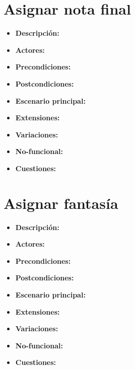 \documentclass[12pt,letterpaper]{article}
\begin{document}
\section{Asignar nota final}
\begin{itemize}
	\item \textbf{Descripción:}
	\item \textbf{Actores:}
	\item \textbf{Precondiciones:}
	\item \textbf{Postcondiciones:}
	\item \textbf{Escenario principal:}
	\item \textbf{Extensiones:}
	\item \textbf{Variaciones:}
	\item \textbf{No-funcional:}
	\item \textbf{Cuestiones:}
\end{itemize}

\section{Asignar fantasía}
\begin{itemize}
	\item \textbf{Descripción:}
	\item \textbf{Actores:}
	\item \textbf{Precondiciones:}
	\item \textbf{Postcondiciones:}
	\item \textbf{Escenario principal:}
	\item \textbf{Extensiones:}
	\item \textbf{Variaciones:}
	\item \textbf{No-funcional:}
	\item \textbf{Cuestiones:}
\end{itemize}
\end{document}
